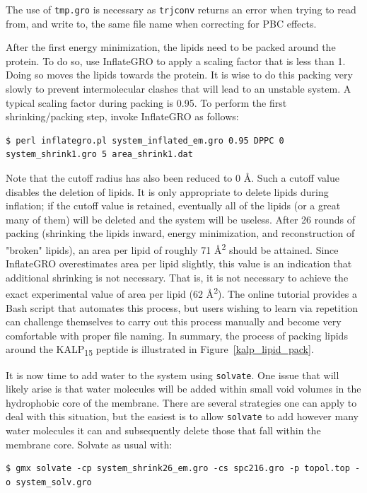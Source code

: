 \documentclass[9pt,tutorial,pubversion]{livecoms}
\begin{document}
The use of \texttt{tmp.gro} is necessary as \texttt{trjconv} returns an error when trying to read from, and write to, the same file name when correcting for PBC effects.

After the first energy minimization, the lipids need to be packed around the protein. To do so, use InflateGRO to apply a scaling factor that is less than 1. Doing so moves the lipids towards the protein. It is wise to do this packing very slowly to prevent intermolecular clashes that will lead to an unstable system. A typical scaling factor during packing is 0.95. To perform the first shrinking/packing step, invoke InflateGRO as follows:

\begin{lstlisting}
$ perl inflategro.pl system_inflated_em.gro 0.95 DPPC 0 system_shrink1.gro 5 area_shrink1.dat
\end{lstlisting}

Note that the cutoff radius has also been reduced to 0 \AA. Such a cutoff value disables the deletion of lipids. It is only appropriate to delete lipids during inflation; if the cutoff value is retained, eventually all of the lipids (or a great many of them) will be deleted and the system will be useless. After 26 rounds of packing (shrinking the lipids inward, energy minimization, and reconstruction of "broken" lipids), an area per lipid of roughly 71 \AA\textsuperscript{2} should be attained. Since InflateGRO overestimates area per lipid slightly, this value is an indication that additional shrinking is not necessary. That is, it is not necessary to achieve the exact experimental value of area per lipid (62 \AA\textsuperscript{2}). The online tutorial provides a Bash script that automates this process, but users wishing to learn via repetition can challenge themselves to carry out this process manually and become very comfortable with proper file naming. In summary, the process of packing lipids around the KALP\textsubscript{15} peptide is illustrated in Figure~\ref{kalp_lipid_pack}.

It is now time to add water to the system using \texttt{solvate}. One issue that will likely arise is that water molecules will be added within small void volumes in the hydrophobic core of the membrane. There are several strategies one can apply to deal with this situation, but the easiest is to allow \texttt{solvate} to add however many water molecules it can and subsequently delete those that fall within the membrane core. Solvate as usual with:

\begin{lstlisting}
$ gmx solvate -cp system_shrink26_em.gro -cs spc216.gro -p topol.top -o system_solv.gro
\end{lstlisting}
\end{document}
